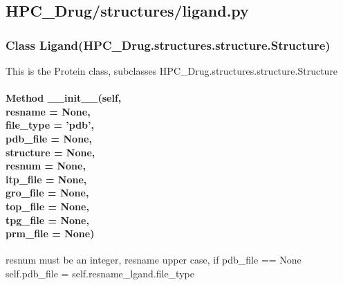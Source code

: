 

\subsection{HPC\_Drug/structures/ligand.py}

    \subsubsection{Class Ligand(HPC\_Drug.structures.structure.Structure)}
    
        This is the Protein class, subclasses HPC\_Drug.structures.structure.Structure
        
        \paragraph{Method \_\_init\_\_(self,\\
        resname = None,\\
        file\_type = 'pdb',\\
        pdb\_file = None,\\
        structure = None,\\
        resnum = None,\\
        itp\_file = None,\\
        gro\_file = None,\\
        top\_file = None,\\
        tpg\_file = None,\\
        prm\_file = None)}

            $\ $\\resnum must be an integer, resname upper case, if pdb\_file == None self.pdb\_file = {self.resname}\_lgand.{file\_type}